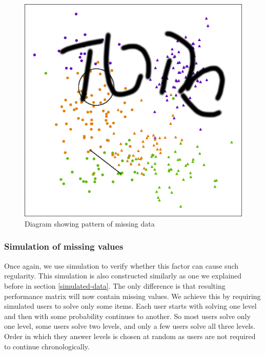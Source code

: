 \documentclass[
  digital, %
  table,   %
  nolof,     %
  nolot,     %
  nocover,
  color,
  final, %
]{fithesis3}
\begin{document}
\begin{figure}
  \includegraphics[width=\textwidth]{img/missing_patter_diagram}
  \caption{Diagram showing pattern of missing data}
  \label{fig:missing_patter_diagram}
\end{figure}


\subsubsection{Simulation of missing values}\label{simulation-of-missing-values}

Once again, we use simulation to verify whether this factor can cause such regularity. This simulation is also constructed similarly as one we explained before in section \ref{simulated-data}. The only difference is that resulting performance matrix will now contain missing values. We achieve this by requiring simulated users to solve only some items. Each user starts with solving one level and then with some probability continues to another. So most users solve only one level, some users solve two levels, and only a few users solve all three levels. Order in which they answer levels is chosen at random as users are not required to continue chronologically.
\end{document}
